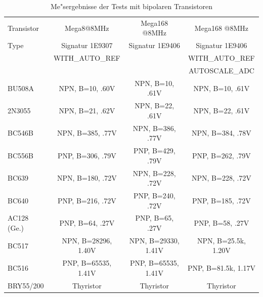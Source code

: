 \begin{table}[H]
  \begin{center}
    \begin{tabular}{| l | c | c | c |}
    \hline
     Transistor & Mega8@8MHz   & Mega168 @8MHz   & Mega168 @8MHz \\
     Type    & Signatur 1E9307 & Signatur 1E9406 & Signatur 1E9406 \\
             & WITH\_AUTO\_REF &                 & WITH\_AUTO\_REF \\
             &                 &                 & AUTOSCALE\_ADC \\
    \hline
    \hline
BU508A & NPN, B=10, .60V & NPN, B=10, .61V & NPN, B=10, .61V\\
    \hline
2N3055 & NPN, B=21, .62V & NPN, B=22, .61V & NPN, B=22, .61V\\
    \hline
BC546B & NPN, B=385, .77V & NPN, B=386, .77V & NPN, B=384, .78V\\
    \hline
BC556B & PNP, B=306, .79V & PNP, B=429, .79V & PNP, B=262, .79V\\
    \hline
BC639 & NPN, B=180, .72V & NPN, B=228, .72V & NPN, B=228, .72V\\

    \hline
BC640 & PNP, B=216, .72V & PNP, B=240, .72V & PNP, B=185, .72V\\
    \hline
AC128 (Ge.) & PNP, B=64, .27V & PNP, B=65, .27V & PNP, B=58, .27V\\
    \hline
BC517 & NPN, B=28296, 1.40V & NPN, B=29330, 1.41V & NPN, B=25.5k, 1.20V\\
    \hline
BC516 & PNP, B=65535, 1.41V & PNP, B=65535, 1.41V & PNP, B=81.5k, 1.17V\\
    \hline
BRY55/200 & Thyristor & Thyristor & Thyristor\\
    \hline
    \end{tabular}
  \end{center}
  \caption{Me"sergebnisse der Tests mit bipolaren Transistoren}
  \label{tab:bipolar} 
\end{table}

